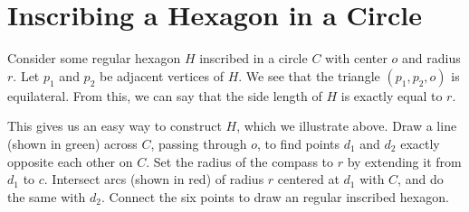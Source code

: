 \documentclass[12pt]{article}
\begin{document}
\section{}
\section{}
\section{}


\section{Inscribing a Hexagon in a Circle}
Consider some regular hexagon $H$ inscribed in a circle $C$ with center $o$ and radius $r$. Let $p_1$ and $p_2$ be adjacent vertices of $H$. We see that the triangle $(p_1,p_2,o)$ is equilateral. From this, we can say that the side length of $H$ is exactly equal to $r$.

\begin{figure}[H] \centering
{}
\end{figure}

This gives us an easy way to construct $H$, which we illustrate above. Draw a line (shown in green) across $C$, passing through $o$, to find points $d_1$ and $d_2$ exactly opposite each other on $C$. Set the radius of the compass to $r$ by extending it from $d_1$ to $c$. Intersect arcs (shown in red) of radius $r$ centered at $d_1$ with $C$, and do the same with $d_2$. Connect the six points to draw an regular inscribed hexagon.
\end{document}
